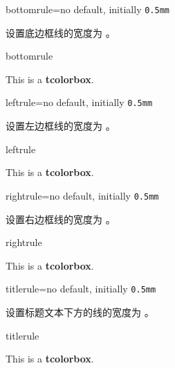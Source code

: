 \begin{docTcbKey}{bottomrule}{=}{no default, initially \texttt{0.5mm}}

设置底边框线的宽度为 。
\begin{exdispExample}{bottomrule}

\begin{tcolorbox}[bottomrule=3mm]
This is a \textbf{tcolorbox}.
\end{tcolorbox}
\end{exdispExample}
\end{docTcbKey}

\begin{docTcbKey}{leftrule}{=}{no default, initially \texttt{0.5mm}}

设置左边框线的宽度为 。
\begin{exdispExample}{leftrule}

\begin{tcolorbox}[leftrule=3mm]
This is a \textbf{tcolorbox}.
\end{tcolorbox}
\end{exdispExample}
\end{docTcbKey}


\begin{docTcbKey}{rightrule}{=}{no default, initially \texttt{0.5mm}}

设置右边框线的宽度为 。
\begin{exdispExample}{rightrule}

\begin{tcolorbox}[rightrule=3mm]
This is a \textbf{tcolorbox}.
\end{tcolorbox}
\end{exdispExample}
\end{docTcbKey}




\begin{docTcbKey}{titlerule}{=}{no default, initially \texttt{0.5mm}}
  
  设置标题文本下方的线的宽度为 。
  \begin{exdispExample}{titlerule}
  
  \begin{tcolorbox}[titlerule=3mm,title=This is the title]
  This is a \textbf{tcolorbox}.
  \end{tcolorbox}
  \end{exdispExample}
  \end{docTcbKey}
  
